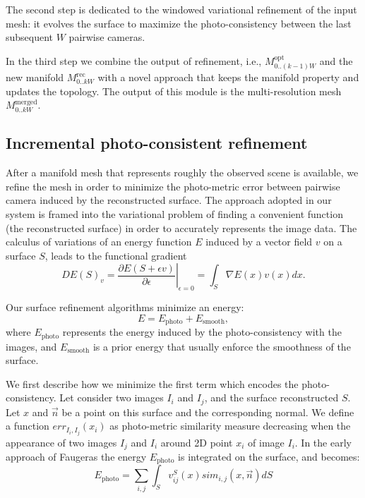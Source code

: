 The second step is dedicated to the windowed variational refinement of the input mesh: it evolves the surface to maximize the photo-consistency between the last subsequent $W$ pairwise cameras. 

In the third step we combine the output of refinement, i.e.,   $\mathit{M}_{0..(k-1)W}^{\text{opt}}$  and the new manifold $\mathit{M}_{0..kW}^{\text{rec}}$ with a novel approach that keeps the manifold property and updates the topology. 
The output of this module is the multi-resolution mesh $\mathit{M}_{0..kW}^{\text{merged}}$.


\subsection{Incremental photo-consistent refinement}
\label{sec:Incremental_photoconsistent}
After a manifold mesh that represents roughly the observed scene is available, we refine the mesh in order to minimize the photo-metric error between pairwise camera induced by the reconstructed surface. 
The approach adopted in our system is framed into the variational problem of finding a convenient function (the reconstructed surface) in order to  accurately represents the image data.
The calculus of variations of an energy function $E$ induced by a vector field $v$ on a surface $\mathit{S}$, leads to the functional gradient
\begin{equation}
\label{eq::calculus}
 DE(\mathit{S})_v = \left.\frac{\partial E(\mathit{S} + \epsilon v)}{\partial \epsilon} \right|_{\epsilon=0} = \int_{\mathit{S}} \nabla E(x)v(x) dx.
\end{equation}

Our surface refinement algorithms minimize an energy:
\begin{equation}
E = E_{\textrm{photo}} + E_{\textrm{smooth}} ,
\end{equation}
where  $E_{\textrm{photo}}$ represents the energy induced by  the photo-consistency with the images, and $E_{\textrm{smooth}}$ is a prior energy that usually enforce the smoothness of the surface.  


We first describe how we minimize the first term which encodes the photo-consistency.
Let consider two images $I_i$ and $I_j$, and the surface reconstructed $\mathit{S}$. Let $x$ and $\overrightarrow{n}$ be a point on this surface and the corresponding normal. We define a function $err_{I_i, I_j}(x_i)$ as photo-metric similarity measure decreasing when the appearance of two images $I_j$ and $I_i$ around 2D point $x_i$ of image $I_i$.
In the early approach of Faugeras \etal \cite{faugeras2002variational} the energy $E_{\textrm{photo}}$ is integrated on the surface, and becomes:
\begin{equation}
 E_{\textrm{photo}} = \sum_{i,j}\int_{\mathit{S}} v^{\mathit{S}}_{ij}(x) sim_{i,j}(x, \overrightarrow{n}) d\mathit{S}
\end{equation}


